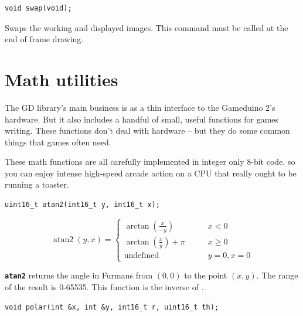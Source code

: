 \documentclass[10pt]{book}
\newcommand{\mach}[1]{\texttt{\textbf{#1}}}
\begin{document}

\begin{framed}
\begin{verbatim}
void swap(void);
\end{verbatim}
\end{framed}

Swaps the working and displayed images.
This command must be called at the end of frame drawing.

\chapter{Math utilities}

The GD library's main business is as a thin
interface to the Gameduino 2's hardware.
But it also includes a handful of small, useful functions for games writing.
These functions don't deal with hardware -- but they do some common
things that games often need.

These math functions are all carefully implemented in integer only 
8-bit code, so you can enjoy intense high-speed arcade action on a CPU that really
ought to be running a toaster.


\begin{framed}
\begin{verbatim}
uint16_t atan2(int16_t y, int16_t x);
\end{verbatim}
\end{framed}

\[
\operatorname{atan2}(y, x) = \begin{cases}
\arctan\left(\frac x {-y} \right) & \qquad x < 0 \\
\arctan\left(\frac x y \right) + \pi& \qquad x \ge 0 \\
\text{undefined} & \qquad y = 0, x = 0
\end{cases}
\]

\mach{atan2} returns the angle in Furmans from $(0,0)$ to the point $(x, y)$.
The range of the result is 0-65535.
This function is the inverse of .
\newpage


\begin{framed}
\begin{verbatim}
void polar(int &x, int &y, int16_t r, uint16_t th);
\end{verbatim}
\end{framed}
\end{document}
